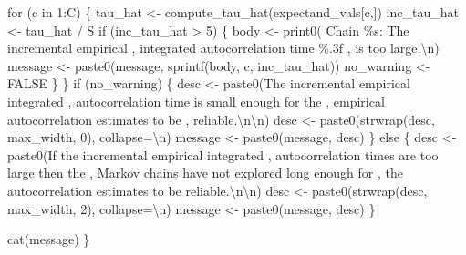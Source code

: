 \documentclass[
  letterpaper,
  DIV=11,
  numbers=noendperiod]{scrartcl}
\newenvironment{Shaded}{\begin{snugshade}}{\end{snugshade}}
\newcommand{\CharTok}[1]{\textcolor[rgb]{0.13,0.47,0.30}{#1}}
\newcommand{\ControlFlowTok}[1]{\textcolor[rgb]{0.00,0.23,0.31}{#1}}
\newcommand{\DecValTok}[1]{\textcolor[rgb]{0.68,0.00,0.00}{#1}}
\newcommand{\KeywordTok}[1]{\textcolor[rgb]{0.00,0.23,0.31}{#1}}
\newcommand{\NormalTok}[1]{\textcolor[rgb]{0.00,0.23,0.31}{#1}}
\newcommand{\OperatorTok}[1]{\textcolor[rgb]{0.37,0.37,0.37}{#1}}
\newcommand{\SpecialCharTok}[1]{\textcolor[rgb]{0.37,0.37,0.37}{#1}}
\newcommand{\StringTok}[1]{\textcolor[rgb]{0.13,0.47,0.30}{#1}}
\begin{document}
\begin{Shaded}
\begin{Highlighting}[]
  \ControlFlowTok{for}\NormalTok{ (c }\KeywordTok{in} \DecValTok{1}\NormalTok{:C) \{}
\NormalTok{    tau\_hat }\OperatorTok{\textless{}{-}}\NormalTok{ compute\_tau\_hat(expectand\_vals[c,])}
\NormalTok{    inc\_tau\_hat }\OperatorTok{\textless{}{-}}\NormalTok{ tau\_hat }\OperatorTok{/}\NormalTok{ S}
    \ControlFlowTok{if}\NormalTok{ (inc\_tau\_hat }\OperatorTok{\textgreater{}} \DecValTok{5}\NormalTok{) \{}
\NormalTok{      body }\OperatorTok{\textless{}{-}}\NormalTok{ print0(}\StringTok{\textquotesingle{}  Chain }\SpecialCharTok{\%s}\StringTok{: The incremental empirical \textquotesingle{}}\NormalTok{,}
                     \StringTok{\textquotesingle{}integrated autocorrelation time }\SpecialCharTok{\%.3f}\StringTok{ \textquotesingle{}}\NormalTok{,}
                     \StringTok{\textquotesingle{}is too large.}\CharTok{\textbackslash{}n}\StringTok{\textquotesingle{}}\NormalTok{)}
\NormalTok{      message }\OperatorTok{\textless{}{-}}\NormalTok{ paste0(message, sprintf(body, c, inc\_tau\_hat))}
\NormalTok{      no\_warning }\OperatorTok{\textless{}{-}}\NormalTok{ FALSE}
\NormalTok{    \}}
\NormalTok{  \}}
  \ControlFlowTok{if}\NormalTok{ (no\_warning) \{}
\NormalTok{    desc }\OperatorTok{\textless{}{-}}\NormalTok{ paste0(}\StringTok{\textquotesingle{}The incremental empirical integrated \textquotesingle{}}\NormalTok{,}
                   \StringTok{\textquotesingle{}autocorrelation time is small enough for the \textquotesingle{}}\NormalTok{,}
                   \StringTok{\textquotesingle{}empirical autocorrelation estimates to be \textquotesingle{}}\NormalTok{,}
                   \StringTok{\textquotesingle{}reliable.}\CharTok{\textbackslash{}n\textbackslash{}n}\StringTok{\textquotesingle{}}\NormalTok{)}
\NormalTok{    desc }\OperatorTok{\textless{}{-}}\NormalTok{ paste0(strwrap(desc, max\_width, }\DecValTok{0}\NormalTok{), collapse}\OperatorTok{=}\StringTok{\textquotesingle{}}\CharTok{\textbackslash{}n}\StringTok{\textquotesingle{}}\NormalTok{)}
\NormalTok{    message }\OperatorTok{\textless{}{-}}\NormalTok{ paste0(message, desc)}
\NormalTok{  \} }\ControlFlowTok{else}\NormalTok{ \{}
\NormalTok{    desc }\OperatorTok{\textless{}{-}}\NormalTok{ paste0(}\StringTok{\textquotesingle{}If the incremental empirical integrated \textquotesingle{}}\NormalTok{,}
                   \StringTok{\textquotesingle{}autocorrelation times are too large then the \textquotesingle{}}\NormalTok{,}
                   \StringTok{\textquotesingle{}Markov chains have not explored long enough for \textquotesingle{}}\NormalTok{,}
                   \StringTok{\textquotesingle{}the autocorrelation estimates to be reliable.}\CharTok{\textbackslash{}n\textbackslash{}n}\StringTok{\textquotesingle{}}\NormalTok{)}
\NormalTok{    desc }\OperatorTok{\textless{}{-}}\NormalTok{ paste0(strwrap(desc, max\_width, }\DecValTok{2}\NormalTok{), collapse}\OperatorTok{=}\StringTok{\textquotesingle{}}\CharTok{\textbackslash{}n}\StringTok{\textquotesingle{}}\NormalTok{)}
\NormalTok{    message }\OperatorTok{\textless{}{-}}\NormalTok{ paste0(message, desc)}
\NormalTok{  \}}

\NormalTok{  cat(message)}
\NormalTok{\}}
\end{Highlighting}
\end{Shaded}
\end{document}
